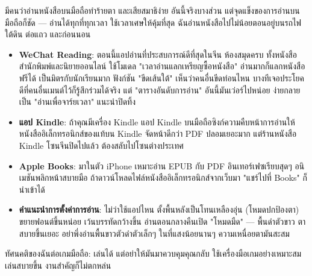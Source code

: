 
มีคนว่าอ่านหนังสือบนมือถือทำร้ายตา และเสียสมาธิง่าย อันนี้จริงบางส่วน แต่จุดแข็งของการอ่านบนมือถือก็ชัด — อ่านได้ทุกที่ทุกเวลา ใช้เวลาเศษให้คุ้มที่สุด ฉันอ่านหนังสือไปไม่น้อยตอนอยู่บนรถไฟใต้ดิน ต่อแถว และก่อนนอน

\begin{itemize}
  \item \textbf{WeChat Reading}: ตอนนี้แอปอ่านที่ประสบการณ์ดีที่สุดในจีน ห้องสมุดครบ ทั้งหนังสือสำนักพิมพ์และนิยายออนไลน์ ใช้โมเดล "เวลาอ่านแลกเหรียญซื้อหนังสือ" อ่านมากก็แลกหนังสือฟรีได้ เป็นมิตรกับนักเรียนมาก ฟังก์ชัน "ขีดเส้นใต้" เห็นว่าคนอื่นขีดท่อนไหน บางทีเจอประโยคดีที่คนอื่นเมนต์ไว้ก็รู้สึกร่วมได้จริง แต่ "ตารางอันดับการอ่าน" อันนี้มันเว่อร์ไปหน่อย ง่ายกลายเป็น "อ่านเพื่อจาร์ยเวลา" แนะนำปิดทิ้ง
  \item \textbf{แอป Kindle}: ถ้าคุณมีเครื่อง Kindle แอป Kindle บนมือถือซิงก์ความคืบหน้าการอ่านให้ หนังสืออิเล็กทรอนิกส์ของแท้บน Kindle จัดหน้าดีกว่า PDF ปลอมเยอะมาก แต่ร้านหนังสือ Kindle โซนจีนปิดไปแล้ว ต้องสลับไปโซนต่างประเทศ
  \item \textbf{Apple Books}: มาในตัว iPhone เหมาะอ่าน EPUB กับ PDF อินเทอร์เฟซเรียบสุดๆ อนิเมชันพลิกหน้าสบายมือ ถ้าดาวน์โหลดไฟล์หนังสืออิเล็กทรอนิกส์จากเว็บมา "แชร์ไปที่ Books" ก็นำเข้าได้
  \item \textbf{คำแนะนำการตั้งค่าการอ่าน}: ไม่ว่าใช้แอปไหน ตั้งพื้นหลังเป็นโทนเหลืองอุ่น (โหมดปกป้องตา) ขยายฟอนต์ขึ้นหน่อย เว้นบรรทัดกว้างขึ้น อ่านตอนกลางคืนเปิด "โหมดมืด" — พื้นดำตัวขาว ตาสบายขึ้นเยอะ อย่าพึ่งอ่านพื้นขาวตัวดำตัวเล็กๆ ในที่แสงน้อยนานๆ ความเหนื่อยตามันสะสม
\end{itemize}


ทัศนคติของฉันต่อเกมมือถือ: เล่นได้ แต่อย่าให้มันมาควบคุมคุณกลับ ใช้เครื่องมือเกมอย่างเหมาะสม เล่นสบายขึ้น งานสำคัญก็ไม่ตกหล่น

